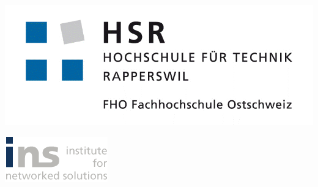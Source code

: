 
\begin{titlepage}
\begin{center}
\begin{minipage}[t]{0.45\textwidth}
    \includegraphics[width=\textwidth]{./22_Grafiken/01_Logo/hsr}
\end{minipage}
\hspace{\fill} %
\begin{minipage}[t]{0.45\textwidth}
    \vspace{-2.5cm}
    \includegraphics[width=\textwidth]{./22_Grafiken/01_Logo/ins} %
\end{minipage}

\end{center}

\vspace{15ex} %
\begin{center}
	\Huge 
	\begin{framed}
		\textbf{\titel}
	\end{framed}
	
	\vspace{3ex}
	\textbf{\arbeit}
	
	\vspace{1ex}
	\LARGE 
	\place
	
	\vspace{5ex}
	\begin{framed}
		\timeperiod
	\end{framed}
\end{center}


\end{titlepage}
